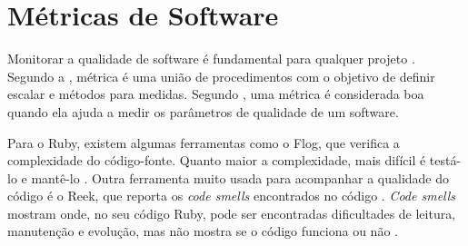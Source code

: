 \section{Métricas de Software}

Monitorar a qualidade de software é fundamental para qualquer projeto \cite{prmm}. Segundo a , métrica é uma união de procedimentos com o objetivo de definir escalar e métodos para medidas. Segundo , uma métrica é considerada boa quando ela ajuda a medir os parâmetros de qualidade de um software. 

Para o Ruby, existem algumas ferramentas como o Flog, que verifica a complexidade do código-fonte. Quanto maior a complexidade, mais difícil é testá-lo e mantê-lo \cite{flog}. Outra ferramenta muito usada para acompanhar a qualidade do código é o Reek, que reporta os \textit{code smells} encontrados no código \cite{reek}. \textit{Code smells} mostram onde, no seu código Ruby, pode ser encontradas dificultades de leitura, manutenção e evolução, mas não mostra se o código funciona ou não \cite{codesmells}.
